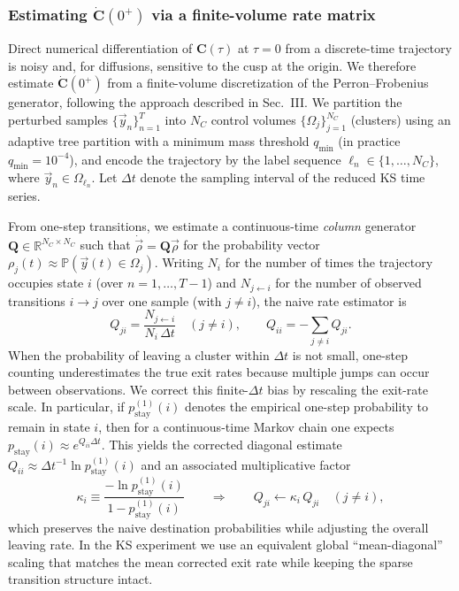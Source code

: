 \documentclass[%
  prl,
  reprint,
  amsmath,
  amssymb,
  aps
]{revtex4-2}
\newcommand{\vvec}[1]{\vec{#1}}
\begin{document}
\subsubsection{Estimating \texorpdfstring{$\dot{\bm{C}}(0^+)$}{Cdot(0)} via a finite-volume rate matrix}
\label{sec:ks_Cdot_estimator}

Direct numerical differentiation of $\bm{C}(\tau)$ at $\tau=0$ from a discrete-time trajectory is noisy and, for diffusions, sensitive to the cusp at the origin. We therefore estimate $\dot{\bm{C}}(0^+)$ from a finite-volume discretization of the Perron--Frobenius generator, following the approach described in Sec.~III. We partition the perturbed samples $\{\vvec{y}_n\}_{n=1}^{T}$ into $N_C$ control volumes $\{\Omega_j\}_{j=1}^{N_C}$ (clusters) using an adaptive tree partition with a minimum mass threshold $q_{\min}$ (in practice $q_{\min}=10^{-4}$), and encode the trajectory by the label sequence $\ell_n\in\{1,\dots,N_C\}$, where $\vvec{y}_n\in\Omega_{\ell_n}$. Let $\Delta t$ denote the sampling interval of the reduced KS time series.

From one-step transitions, we estimate a continuous-time \emph{column} generator $\bm{Q}\in\mathbb{R}^{N_C\times N_C}$ such that $\dot{\vvec{\rho}}=\bm{Q}\vvec{\rho}$ for the probability vector $\rho_j(t)\approx \mathbb{P}(\vvec{y}(t)\in\Omega_j)$. Writing $N_i$ for the number of times the trajectory occupies state $i$ (over $n=1,\dots,T-1$) and $N_{j\leftarrow i}$ for the number of observed transitions $i\to j$ over one sample (with $j\neq i$), the naive rate estimator is
\begin{equation}
Q_{j i}=\frac{N_{j\leftarrow i}}{N_i\,\Delta t}\quad (j\neq i),
\qquad
Q_{ii}=-\sum_{j\neq i}Q_{j i}.
\label{eq:ks_Q_naive}
\end{equation}
When the probability of leaving a cluster within $\Delta t$ is not small, one-step counting underestimates the true exit rates because multiple jumps can occur between observations. We correct this finite-$\Delta t$ bias by rescaling the exit-rate scale. In particular, if $p^{(1)}_{\mathrm{stay}}(i)$ denotes the empirical one-step probability to remain in state $i$, then for a continuous-time Markov chain one expects $p_{\mathrm{stay}}(i)\approx e^{Q_{ii}\Delta t}$. This yields the corrected diagonal estimate $Q_{ii}\approx \Delta t^{-1}\ln p^{(1)}_{\mathrm{stay}}(i)$ and an associated multiplicative factor
\begin{equation}
\kappa_i
\equiv
\frac{-\ln p^{(1)}_{\mathrm{stay}}(i)}{1-p^{(1)}_{\mathrm{stay}}(i)}
\qquad
\Rightarrow\qquad
Q_{j i}\leftarrow \kappa_i\,Q_{j i}\quad (j\neq i),
\label{eq:ks_finite_dt_correction}
\end{equation}
which preserves the naive destination probabilities while adjusting the overall leaving rate.
In the KS experiment we use an equivalent global ``mean-diagonal'' scaling that matches the mean corrected exit rate while keeping the sparse transition structure intact.
\end{document}
